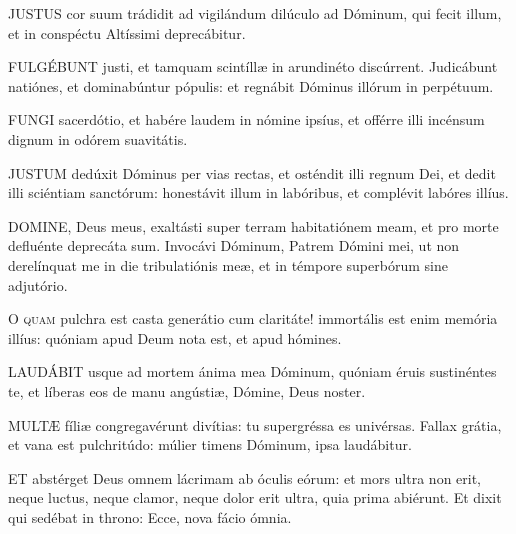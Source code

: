 
\lettrine[lines=2]{J}{USTUS} cor suum trádidit ad vigilándum dilúculo ad Dóminum, qui fecit illum, et in conspéctu Altíssimi deprecábitur.


\lettrine[lines=2]{F}{ULGÉBUNT} justi, et tamquam scintíllæ in arundinéto discúrrent. Judicábunt natiónes, et dominabúntur pópulis: et regnábit Dóminus illórum in perpétuum.


\lettrine[lines=2]{F}{UNGI} sacerdótio, et habére laudem in nómine ipsíus, et offérre illi incénsum dignum in odórem suavitátis.


\lettrine[lines=2]{J}{USTUM} dedúxit Dóminus per vias rectas, et osténdit illi regnum Dei, et dedit illi sciéntiam sanctórum: honestávit illum in labóribus, et complévit labóres illíus.


\lettrine[lines=2]{D}{OMINE}, Deus meus, exaltásti super terram habitatiónem meam, et pro morte defluénte deprecáta sum. Invocávi Dóminum, Patrem Dómini mei, ut non derelínquat me in die tribulatiónis meæ, et in témpore superbórum sine adjutório.


\lettrine[lines=2]{O}{} \textsc{quam} pulchra est casta generátio cum claritáte! immortális est enim memória illíus: quóniam apud Deum nota est, et apud hómines.


\lettrine[lines=2]{L}{AUDÁBIT} usque ad mortem ánima mea Dóminum, quóniam éruis sustinéntes te, et líberas eos de manu angústiæ, Dómine, Deus noster.


\lettrine[lines=2]{M}{ULTÆ} fíliæ congregavérunt divítias: tu supergréssa es univérsas. Fallax grátia, et vana est pulchritúdo: múlier timens Dóminum, ipsa laudábitur.


\lettrine[lines=2]{E}{T} abstérget Deus omnem lácrimam ab óculis eórum: et mors ultra non erit, neque luctus, neque clamor, neque dolor erit ultra, quia prima abiérunt. Et dixit qui sedébat in throno: Ecce, nova fácio ómnia.

